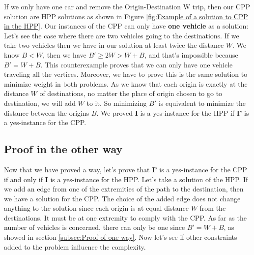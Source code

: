 \documentclass[12pt, a4paper,twoside]{memoir}
\newcommand{\newpar}{\vskip 0.2in \noindent}
\begin{document}
	If we only have one car and remove the Origin-Destination W trip, then our CPP solution are HPP solutions as shown in Figure \ref{fig:Example of a solution to CPP in the HPP}.
	\newpar
	Our instances of the CPP can only have \textbf{one vehicle} as a solution:\newline
	Let's see the case where there are two vehicles going to the destinations.\newline
	If we take two vehicles then we have in our solution at least twice the distance $W$.\newline
	We know $B<W$, then we have $B'\ge 2W>W+B$, and that's impossible because $B'=W+B$. \newline
	This counterexample proves that we can only have one vehicle traveling all the vertices.
	\newpar
	Moreover, we have to prove this is the same solution to minimize weight in both problems.\newline
	As we know that each origin is exactly at the distance $W$ of destinations, no matter the place of origin chosen to go to destination, we will add $W$ to it.\newline
	So minimizing $B'$ is equivalent to minimize the distance between the origins $B$.\newline
	We proved \textbf{I} is a yes-instance for the HPP if \textbf{I'} is a yes-instance for the CPP.
	
	\subsection{Proof in the other way}
	
	Now that we have proved a way, let's prove that \textbf{I'} is a yes-instance for the CPP if and only if \textbf{I} is a yes-instance for the HPP.\newline
	Let's take a solution of the HPP. If we add an edge from one of the extremities of the path to the destination, then we have a solution for the CPP. \newline
	The choice of the added edge does not change anything to the solution since each origin is at equal distance $W$ from the destinations. It must be at one extremity to comply with the CPP. \newline
	As far as the number of vehicles is concerned, there can only be one since $B'=W+B$, as showed in section \ref{subsec:Proof of one way}.
	\newpar
	Now let's see if other constraints added to the problem influence the complexity.
	
\end{document}
